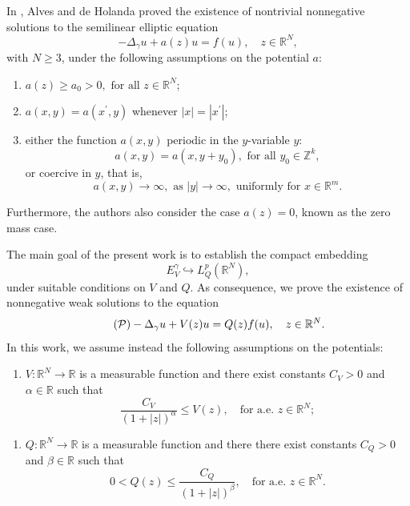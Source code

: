 \documentclass[12pt]{amsart}
\begin{document}
In \cite{Alves-Angelo}, Alves and de Holanda proved the 
existence of nontrivial nonnegative solutions to the semilinear elliptic equation
\begin{equation}\label{grushinC}
	-\Delta _{\gamma }u+a(z) u=f(u), \quad z\in \mathbb{R}^N,
\end{equation}
with \(N \geq3\), under the following assumptions on the potential $a$:
\begin{enumerate}
    \item $a(z) \geq a_0>0, \text { for all } z \in \mathbb{R}^N$;
    \item $
a(x, y)=a\left(x^{\prime}, y\right)$ whenever $|x|=\left|x^{\prime}\right|$;
\item either the function $a(x,y)$ periodic in the $y$-variable $y$: $$ a(x, y)=a\left(x, y+y_0\right), \text { for all } y_0 \in \mathbb{Z}^k,
$$
or coercive in $y$, that is,
$$
a(x, y) \longrightarrow \infty, \text { as }|y| \longrightarrow \infty, \text { uniformly for } x \in \mathbb{R}^m .
$$
\end{enumerate}
Furthermore, the authors also consider the case \(a(z)=0\), known as the zero mass case. 

The main goal of the present work is to establish the compact embedding $$E_V^\gamma \hookrightarrow L^p_Q(\mathbb{R}^N) ,$$ under suitable conditions on $V$ and $Q$. As consequence, we prove the existence of nonnegative weak solutions to the equation
\begin{equation}\tag{$\mathcal{P}$}\label{P}
	-\Delta_\gamma u + V(z)u = Q(z)f(u), \quad z\in \mathbb{R}^N.
\end{equation}
In this work, we assume instead the following assumptions on the potentials:
\begin{enumerate}[label=($V$),ref=$(V)$]
	\item \label{V} $V: \mathbb{R}^N\to \mathbb{R}$ is a measurable function and there exist constants  $C_V>0$ and $\alpha\in\mathbb{R}$ such that
	$$
	\frac{C_V}{\left(1+|z|\right)^\alpha}\leq V(z), \quad\mbox{for a.e. } z\in\mathbb{R}^N;
	$$
\end{enumerate}

\begin{enumerate}[label=($Q$),ref=$(Q)$]
	\item \label{Q} $Q: \mathbb{R}^N\to \mathbb{R}$ is a measurable function and there there exist constants   $C_Q>0$ and $\beta\in\mathbb{R}$ such that
	$$
	0<Q(z)\leq \frac{C_Q}{\left(1+|z|\right)^\beta}, \quad\mbox{for a.e. } z\in\mathbb{R}^N.
	$$
\end{enumerate}
\end{document}
